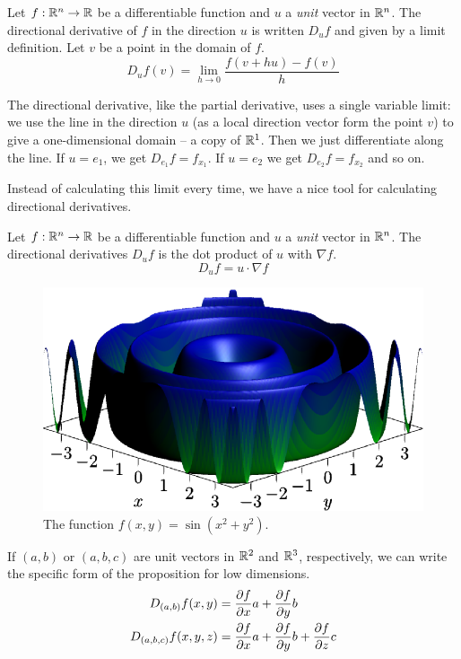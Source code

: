 \documentclass[fleqn,letterpaper]{report}
\begin{document}
\begin{defn}
Let $f: \mathbb{R}^n \rightarrow \mathbb{R}$ be a differentiable function
and $u$ a \emph{unit} vector in $\mathbb{R}^n$. The directional
derivative of $f$ in the direction $u$ is written $D_u
f$ and given by a limit definition. Let $v$ be a point in the
domain of $f$. 
\begin{equation*}
D_u f(v) = \lim_{h \rightarrow 0} \frac{ f(v + hu) - f(v)}{h}
\end{equation*}
\end{defn}

The directional derivative, like the partial derivative,
uses a single variable limit: we use the line in
the direction $u$ (as a local direction vector form the point
$v$) to give a one-dimensional domain -- a copy of $\mathbb{R}^1$.
Then we just differentiate along the line. If $u = e_1$, we
get $D_{e_1} f = f_{x_1}$. If $u = e_2$ we get $D_{e_2} f =
f_{x_2}$ and so on. 

Instead of calculating this limit every time, we have a nice
tool for calculating directional derivatives.
\begin{prop}
Let $f: \mathbb{R}^n \rightarrow \mathbb{R}$ be a differentiable function
and $u$ a \emph{unit} vector in $\mathbb{R}^n$. The directional
derivatives $D_u f$ is the dot product of $u$ with $\nabla f$. 
\begin{equation*}
D_u f = u \cdot \nabla f
\end{equation*}
\end{prop}

\begin{figure}[t]
\centering
\includegraphics[width=12cm]{figure40.eps}
\caption{The function $f(x,y) = \sin (x^2 + y^2)$.}
\label{figure-3d-graph3}
\end{figure}

If $(a,b)$ or $(a,b,c)$ are unit vectors in $\mathbb{R}^2$ and
$\mathbb{R}^3$, respectively, we can write the specific form of the
proposition for low dimensions. 
\begin{align*}
D_{(a,b)} f(x,y) & = 
\frac{\partial f}{\partial x} a + 
\frac{\partial f}{\partial y} b \\
D_{(a,b,c)} f(x,y,z) & = 
\frac{\partial f}{\partial x} a + 
\frac{\partial f}{\partial y} b + 
\frac{\partial f}{\partial z} c 
\end{align*}
\end{document}
